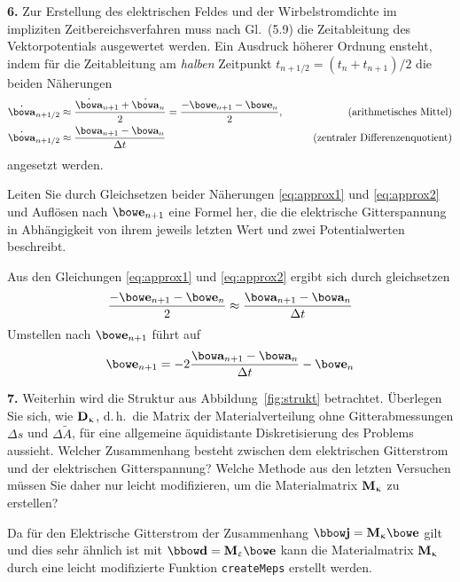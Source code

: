 \documentclass[Protokollheft.tex]{subfiles}
\begin{document}
\begin{framed}
	\noindent \textbf{6.}\label{loop}
      Zur Erstellung des elektrischen Feldes und der Wirbelstromdichte
      im impliziten Zeitbereichsverfahren muss nach Gl.~(5.9) die
      Zeitableitung des Vektorpotentials ausgewertet werden.
      Ein Ausdruck höherer Ordnung ensteht, indem für die
      Zeitableitung am \emph{halben} Zeitpunkt $t_{n+1/2}=(t_n+t_{n+1})/2$
      die beiden Näherungen
      \begin{align}\label{eq:approx1}
        \dot{\afit}_{n+1/2} &\approx \frac{\dot{\afit}_{n+1}+\dot{\afit}_n}{2} = \frac{-\efit_{n+1} - \efit_{n}}{2}, &\qquad\mbox{(arithmetisches Mittel)}\\
        \label{eq:approx2} \dot{\afit}_{n+1/2} &\approx \frac{\afit_{n+1} - \afit_{n}}{\Delta t} &\qquad\mbox{(zentraler Differenzenquotient)}
      \end{align}
      angesetzt werden.
    
      Leiten Sie durch Gleichsetzen beider Näherungen \eqref{eq:approx1} und \eqref{eq:approx2} und Auflösen nach
      $\efit_{n+1}$ eine Formel her, die die elektrische Gitterspannung
      in Abhängigkeit von ihrem jeweils letzten Wert und zwei
      Potentialwerten beschreibt.\label{exer:formulaEfit4pots}
\end{framed}
\noindent
Aus den Gleichungen \ref{eq:approx1} und \ref{eq:approx2} ergibt sich durch gleichsetzen
\begin{equation}
	\frac{-\efit_{n+1} - \efit_{n}}{2} \approx \frac{\afit_{n+1} - \afit_{n}}{\Delta t}
\end{equation}
Umstellen nach $\efit_{n+1}$ führt auf
\begin{equation}
	\efit_{n+1} = -2\frac{\afit_{n+1}-\afit_{n}}{\Delta t} - \efit_{n}
\end{equation}
\begin{framed}
	\noindent \textbf{7.} Weiterhin wird die Struktur aus Abbildung~\ref{fig:strukt} betrachtet. Überlegen Sie sich, wie
      $\mathbf{D}_{\upkappa}$, d.\,h.\ die Matrix der Materialverteilung ohne Gitterabmessungen $\Delta s$ und $\Delta \widetilde{A}$, für eine allgemeine äquidistante Diskretisierung des Problems aussieht. Welcher Zusammenhang besteht zwischen dem elektrischen Gitterstrom und der elektrischen Gitterspannung? Welche Methode aus den letzten Versuchen
      müssen Sie daher nur leicht modifizieren, um die Materialmatrix $\mathbf{M}_{\upkappa}$ zu erstellen?
      \label{exer:calcDkap}
\end{framed}
\noindent
Da für den Elektrische Gitterstrom der Zusammenhang $\jfit = \Mkap \efit$ gilt und dies sehr ähnlich ist mit $\dfit = \Meps \efit$ kann die Materialmatrix $\mathbf{M}_{\upkappa}$ durch eine leicht modifizierte Funktion \lstinline{createMeps} erstellt werden. 
\\
\end{document}
